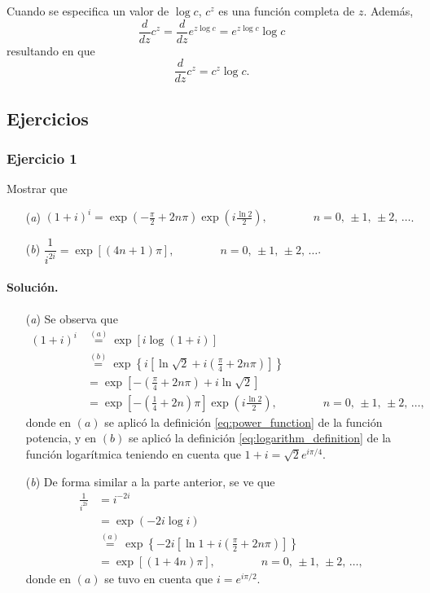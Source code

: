 \documentclass[a4paper]{report}
\begin{document}
Cuando se especifica un valor de \(\log c\), \(c^z\) es una función completa de \(z\). Además,
\[
 \frac{d}{dz}c^z=\frac{d}{dz}e^{z\log c}=e^{z\log c}\log c
\]
resultando en que 
\begin{equation}\label{eq:power_constant_derivative}
 \frac{d}{dz}c^z=c^z\log c. 
\end{equation}

\subsection*{Ejercicios}

\subsubsection{Ejercicio 1}

Mostrar que 
\begin{enumerate}
 \item[(\textit{a})] \(\displaystyle (1+i)^i=\exp\left(-\frac{\pi}{2}+2n\pi\right)\exp\left(i\frac{\ln2}{2}\right),\qquad\qquad n=0,\,\pm1,\,\pm2,\,\dots\). 
 \item[(\textit{b})] \(\displaystyle \dfrac{1}{i^{2i}}=\exp[(4n+1)\pi],\qquad\qquad n=0,\,\pm1,\,\pm2,\,\dots\). 
\end{enumerate}

\paragraph{Solución.} 

\begin{enumerate}
 \item[(\textit{a})] Se observa que 
 \begin{align*}
  (1+i)^i&\overset{(a)}{=}\exp\left[i\log(1+i)\right]\\
   &\overset{(b)}{=}\exp\left\{i\left[\ln\sqrt{2}+i\left(\frac{\pi}{4}+2n\pi\right)\right]\right\}\\
   &=\exp\left[-\left(\frac{\pi}{4}+2n\pi\right)+i\ln\sqrt{2}\right]\\
   &=\exp\left[-\left(\frac{1}{4}+2n\right)\pi\right]\exp\left(i\frac{\ln2}{2}\right),
   \qquad\qquad n=0,\,\pm1,\,\pm2,\,\dots,
 \end{align*}
 donde en \((a)\) se aplicó la definición \ref{eq:power_function} de la función potencia, y en \((b)\) se aplicó la definición \ref{eq:logarithm_definition} de la función logarítmica teniendo en cuenta que \(1+i=\sqrt{2}e^{i\pi/4}\). 
 \item[(\textit{b})] De forma similar a la parte anterior, se ve que
 \begin{align*}
  \frac{1}{i^{2i}}&=i^{-2i}\\
   &=\exp\left(-2i\log i\right)\\
   &\overset{(a)}{=}\exp\left\{-2i\left[\ln1+i\left(\frac{\pi}{2}+2n\pi\right)\right]\right\}\\
   &=\exp\left[(1+4n)\pi\right],
   \qquad\qquad n=0,\,\pm1,\,\pm2,\,\dots,
 \end{align*}
 donde en \((a)\) se tuvo en cuenta que \(i=e^{i\pi/2}\).
\end{enumerate}
\end{document}
